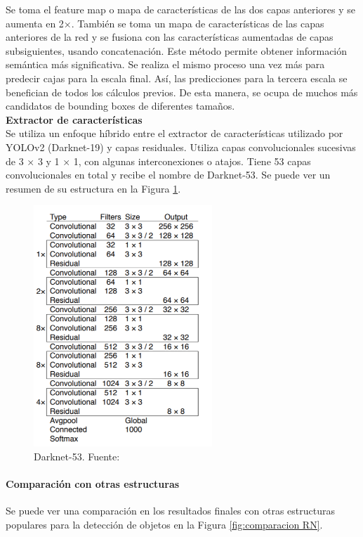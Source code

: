 Se toma el feature map o mapa de características de las dos capas anteriores y se aumenta en 2×. También se toma un mapa de características de las capas anteriores de la red y se fusiona con las características aumentadas de capas subsiguientes, usando concatenación. Este método permite obtener información semántica más significativa. Se realiza el mismo proceso una vez más para predecir cajas para la escala final. Así, las predicciones para la tercera escala se benefician de todos los cálculos previos. De esta manera, se ocupa de muchos más candidatos de bounding boxes de diferentes tamaños. \\


\textbf{Extractor de características} \\

Se utiliza un enfoque híbrido entre el extractor de características utilizado por YOLOv2 (Darknet-19) \cite{yolov2} y capas residuales. Utiliza capas convolucionales sucesivas de 3 × 3 y 1 × 1, con algunas interconexiones o atajos. Tiene 53 capas convolucionales en total y recibe el nombre de Darknet-53. Se puede ver un resumen de su estructura en la Figura \ref{fig:darknet-53}.

\begin{figure}[h!]
    \centering
    \includegraphics[width=0.6\textwidth]{img/Darknet53.png}
    \caption{Darknet-53. Fuente: \cite{yolov3}}
    \label{fig:darknet-53}
\end{figure}

\newpage
\paragraph{Comparación con otras estructuras}
Se puede ver una comparación en los resultados finales con otras estructuras populares para la detección de objetos en la Figura \ref{fig:comparacion RN}.

